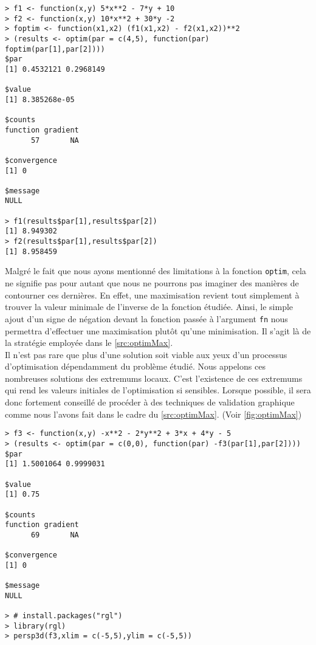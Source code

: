 \begin{lstlisting}[caption = Optimisation générique avec R,label=src:optim]
> f1 <- function(x,y) 5*x**2 - 7*y + 10
> f2 <- function(x,y) 10*x**2 + 30*y -2
> foptim <- function(x1,x2) (f1(x1,x2) - f2(x1,x2))**2
> (results <- optim(par = c(4,5), function(par) foptim(par[1],par[2])))
$par
[1] 0.4532121 0.2968149

$value
[1] 8.385268e-05

$counts
function gradient 
      57       NA 

$convergence
[1] 0

$message
NULL

> f1(results$par[1],results$par[2])
[1] 8.949302
> f2(results$par[1],results$par[2])
[1] 8.958459
\end{lstlisting}

\vspace{\baselineskip}
Malgré le fait que nous ayons mentionné des limitations à la fonction \texttt{optim}, cela ne signifie pas pour autant que nous ne pourrons pas imaginer des manières de contourner ces dernières. En effet, une maximisation revient tout simplement à trouver la valeur minimale de l'inverse de la fonction étudiée. Ainsi, le simple ajout d'un signe de négation devant la fonction passée à l'argument \texttt{fn} nous permettra d'effectuer une maximisation plutôt qu'une minimisation. Il s'agit là de la stratégie employée dans le \autoref{src:optimMax}. \\

Il n’est pas rare que plus d’une solution soit viable aux yeux d’un processus d’optimisation dépendamment du problème étudié. Nous appelons ces nombreuses solutions des extremums locaux. C'est l'existence de ces extremums qui rend les valeurs initiales de l'optimisation si sensibles. Lorsque possible, il sera donc fortement conseillé de procéder à des techniques de validation graphique comme nous l'avons fait dans le cadre du \autoref{src:optimMax}. (Voir \autoref{fig:optimMax}) \\

\begin{lstlisting}[caption = Maximisation d'une fonction avec \texttt{optim},label=src:optimMax]
> f3 <- function(x,y) -x**2 - 2*y**2 + 3*x + 4*y - 5
> (results <- optim(par = c(0,0), function(par) -f3(par[1],par[2])))
$par
[1] 1.5001064 0.9999031

$value
[1] 0.75

$counts
function gradient 
      69       NA 

$convergence
[1] 0

$message
NULL

> # install.packages("rgl")
> library(rgl)
> persp3d(f3,xlim = c(-5,5),ylim = c(-5,5))
\end{lstlisting}

